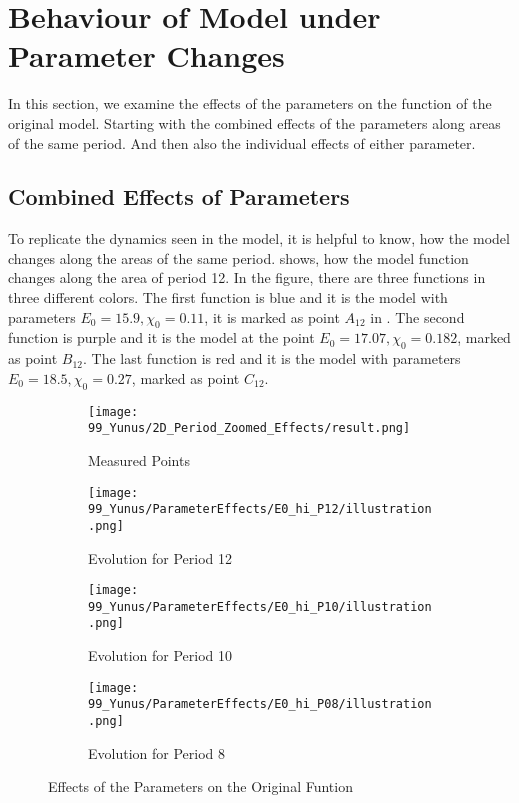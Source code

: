 \section{Behaviour of Model under Parameter Changes}
\label{sec:yunus.param.effects}

In this section, we examine the effects of the parameters on the function of the original model.
Starting with the combined effects of the parameters along areas of the same period.
And then also the individual effects of either parameter.

\subsection{Combined Effects of Parameters}
\label{sec:yunus.param.effects.combined}

To replicate the dynamics seen in the model, it is helpful to know, how the model changes along the areas of the same period.
 shows, how the model function changes along the area of period 12.
In the figure, there are three functions in three different colors.
The first function is blue and it is the model with parameters $E_0 = 15.9, \chi_0 = 0.11$, it is marked as point $A_12$ in .
The second function is purple and it is the model at the point $E_0 = 17.07, \chi_0 = 0.182$, marked as point $B_{12}$.
The last function is red and it is the model with parameters $E_0 = 18.5, \chi_0 = 0.27$, marked as point $C_{12}$.

\begin{figure}
    \centering
    \begin{subfigure}{0.4\textwidth}
        \texttt{[image: 99\_Yunus/2D\_Period\_Zoomed\_Effects/result.png]}
        \caption{Measured Points}
        \label{fig:yunus.function.evolution.map}
    \end{subfigure}
    \begin{subfigure}{0.4\textwidth}
        \texttt{[image: 99\_Yunus/ParameterEffects/E0\_hi\_P12/illustration.png]}
        \caption{Evolution for Period 12}
        \label{fig:yunus.function.evolution.12}
    \end{subfigure}
    \begin{subfigure}{0.4\textwidth}
        \texttt{[image: 99\_Yunus/ParameterEffects/E0\_hi\_P10/illustration.png]}
        \caption{Evolution for Period 10}
        \label{fig:yunus.function.evolution.10}
    \end{subfigure}
    \begin{subfigure}{0.4\textwidth}
        \texttt{[image: 99\_Yunus/ParameterEffects/E0\_hi\_P08/illustration.png]}
        \caption{Evolution for Period 8}
        \label{fig:yunus.function.evolution.08}
    \end{subfigure}
    \caption{Effects of the Parameters on the Original Funtion}
\end{figure}

